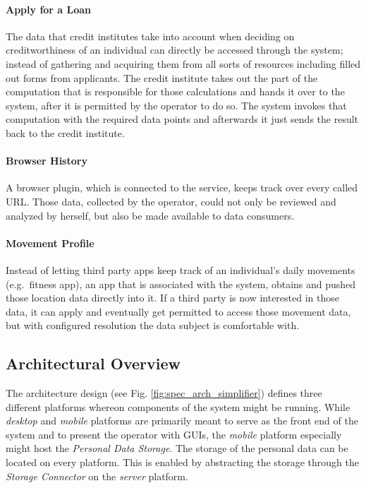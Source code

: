 \documentclass[12pt,english,a4paper,titlepage,cleardoublepage=empty,dottedtoc]{report}
\begin{document}
\paragraph{Apply for a Loan}\label{apply-for-a-loan}

The data that credit institutes take into account when deciding on
creditworthiness of an individual can directly be accessed through the
system; instead of gathering and acquiring them from all sorts of
resources including filled out forms from applicants. The credit
institute takes out the part of the computation that is responsible for
those calculations and hands it over to the system, after it is
permitted by the operator to do so. The system invokes that computation
with the required data points and afterwards it just sends the result
back to the credit institute.

\paragraph{Browser History}\label{browser-history}

A browser plugin, which is connected to the service, keeps track over
every called URL. Those data, collected by the operator, could not only
be reviewed and analyzed by herself, but also be made available to data
consumers.

\paragraph{Movement Profile}\label{movement-profile}

Instead of letting third party apps keep track of an individual's daily
movements (e.g.~fitness app), an app that is associated with the system,
obtains and pushed those location data directly into it. If a third
party is now interested in those data, it can apply and eventually get
permitted to access those movement data, but with configured resolution
the data subject is comfortable with.

\subsection*{Architectural Overview}\label{architectural-overview}

The architecture design (see Fig. \ref{fig:spec_arch_simplifier})
defines three different platforms whereon components of the system might
be running. While \emph{desktop} and \emph{mobile} platforms are
primarily meant to serve as the front end of the system and to present
the operator with GUIs, the \emph{mobile} platform especially might host
the \emph{Personal Data Storage}. The storage of the personal data can
be located on every platform. This is enabled by abstracting the storage
through the \emph{Storage Connector} on the \emph{server} platform.
\end{document}
